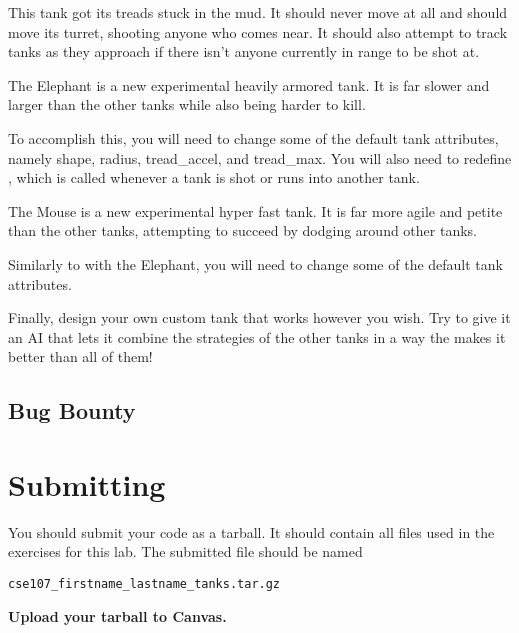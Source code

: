 \documentclass[11pt]{cselabheader}
\begin{document}
\begin{ex}[turret.py]
This tank got its treads stuck in the mud. It should never move at all and
should move its turret, shooting anyone who comes near. It should also attempt
to track tanks as they approach if there isn't anyone currently in range to be
shot at.
\end{ex}

\begin{ex}[elephant.py]
The Elephant is a new experimental heavily armored tank. It is far slower and
larger than the other tanks while also being harder to kill.

To accomplish this, you will need to change some of the default tank attributes,
namely shape, radius, tread\_accel, and tread\_max. You will also need to
redefine , which is called whenever a tank is shot
or runs into another tank.
\end{ex}

\begin{ex}[mouse.py]
The Mouse is a new experimental hyper fast tank. It is far more agile and
petite than the other tanks, attempting to succeed by dodging around other
tanks.

Similarly to with the Elephant, you will need to change some of the default tank
attributes.
\end{ex}

\begin{ex}[custom.py]
Finally, design your own custom tank that works however you wish. Try to give it
an AI that lets it combine the strategies of the other tanks in a way the makes
it better than all of them!
\end{ex}


\subsection{Bug Bounty}


\section{Submitting}
You should submit your code as a tarball. It should contain all files
used in the exercises for this lab. The submitted file should be named
\begin{center}
  \texttt{cse107\_firstname\_lastname\_tanks.tar.gz}
\end{center}

\begin{center}
  \textbf{Upload your tarball to Canvas.}
\end{center}

\listoftheorems
\end{document}
